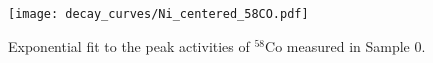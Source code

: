 \begin{figure}[htb]
\texttt{[image: decay\_curves/Ni\_centered\_58CO.pdf]}
\caption{Exponential fit to the peak activities of $^{58}$Co measured in Sample 0.
}
\label{fig:Ni_centered_58CO}
\end{figure}

